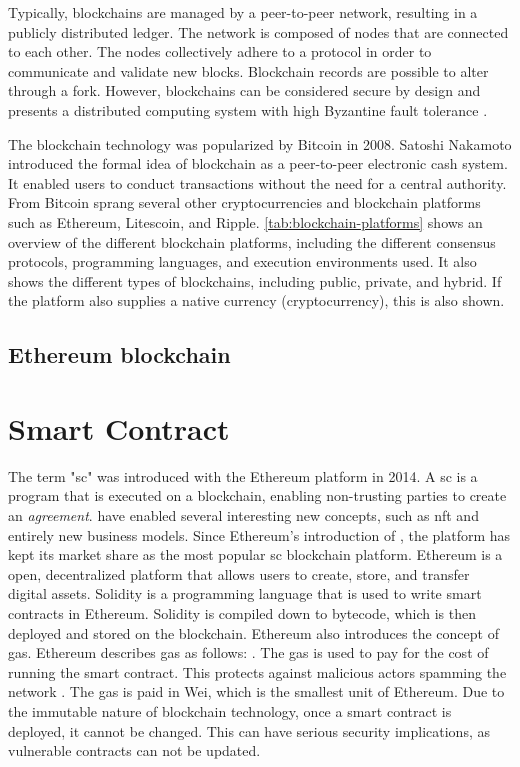 Typically, blockchains are managed by a peer-to-peer network, resulting in a publicly distributed ledger. The network is composed of nodes that are connected to each other. The nodes collectively adhere to a protocol in order to communicate and validate new blocks. Blockchain records are possible to alter through a \gls{fork}. However, blockchains can be considered secure by design and presents a distributed computing system with high Byzantine fault tolerance \cite{sankar2017survey}.

The blockchain technology was popularized by Bitcoin in 2008. Satoshi Nakamoto introduced the formal idea of blockchain as a peer-to-peer electronic cash system. It enabled users to conduct transactions without the need for a central authority. From Bitcoin sprang several other cryptocurrencies and blockchain platforms such as Ethereum, Litescoin, and Ripple. \cref{tab:blockchain-platforms} shows an overview of the different blockchain platforms, including the different consensus protocols, programming languages, and execution environments used. It also shows the different types of blockchains, including public, private, and hybrid. If the platform also supplies a native currency (cryptocurrency), this is also shown.


\subsection{Ethereum blockchain}
\label{sec:ethereum}


\section{Smart Contract}
\label{sec:smart-contract}

The term "\acrlong{sc}" was introduced with the Ethereum platform in 2014. A \acrfull{sc} is a program that is executed on a blockchain, enabling non-trusting parties to create an \textit{agreement}.  have enabled several interesting new concepts, such as \acrfull{nft} and entirely new business models. Since Ethereum's introduction of , the platform has kept its market share as the most popular \acrshort{sc} blockchain platform. Ethereum is a open, decentralized platform that allows users to create, store, and transfer digital assets. Solidity is a programming language that is used to write smart contracts in Ethereum. Solidity is compiled down to bytecode, which is then deployed and stored on the blockchain. Ethereum also introduces the concept of gas. Ethereum describes gas as follows:  \cite{ethereum2021gas}. The gas is used to pay for the cost of running the smart contract. This protects against malicious actors spamming the network \cite{ethereum2021gas}. The gas is paid in Wei, which is the smallest unit of Ethereum. Due to the immutable nature of blockchain technology, once a smart contract is deployed, it cannot be changed. This can have serious security implications, as vulnerable contracts can not be updated.

